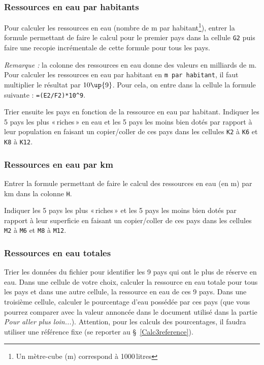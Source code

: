 
\subsubsection{Ressources en eau par habitants}

Pour calculer les ressources en eau (nombre de m par habitant\footnote{Un mètre-cube (m) correspond à 1000\,litres}), entrer la formule permettant de faire le calcul pour le premier pays dans la cellule \texttt{G2} puis faire une recopie incrémentale de cette formule pour tous les pays.

\emph{Remarque :} la colonne des ressources en eau donne des valeurs en milliards de m. Pour calculer les ressources en eau par habitant en \texttt{m par habitant}, il faut multiplier le résultat par $10\up{9}$. Pour cela, on entre dans la cellule la formule suivante : \texttt{=(E2/F2)*10}\texttt{\^}\texttt{9}.

Trier ensuite les pays en fonction de la ressource en eau par habitant. Indiquer les 5 pays les plus «\,riches\,» en eau et les 5 pays les moins bien dotés par rapport à leur population en faisant un copier/coller de ces pays dans les cellules \texttt{K2} à \texttt{K6} et \texttt{K8} à \texttt{K12}.

\subsubsection{Ressources en eau par km}

Entrer la formule permettant de faire le calcul des ressources en eau (en m) par km dans la colonne \texttt{H}.

Indiquer les 5 pays les plus «\,riches\,» et les 5 pays les moins bien dotés par rapport à leur superficie en faisant un copier/coller de ces pays dans les cellules \texttt{M2} à \texttt{M6} et \texttt{M8} à \texttt{M12}.


\subsubsection{Ressources en eau totales}

Trier les données du fichier pour identifier les 9 pays qui ont le plus de réserve en eau. Dans une cellule de votre choix, calculer la ressource en eau totale pour tous les pays et dans une autre cellule, la ressource en eau de ces 9 pays. Dans une troisième cellule, calculer le pourcentage d'eau possédée par ces pays (que vous pourrez comparer avec la valeur annoncée dans le document utilisé dans la partie \emph{Pour aller plus loin...}). Attention, pour les calculs des pourcentages, il faudra utiliser une référence fixe (se reporter au \S\ \vref{Calc3reference}).

